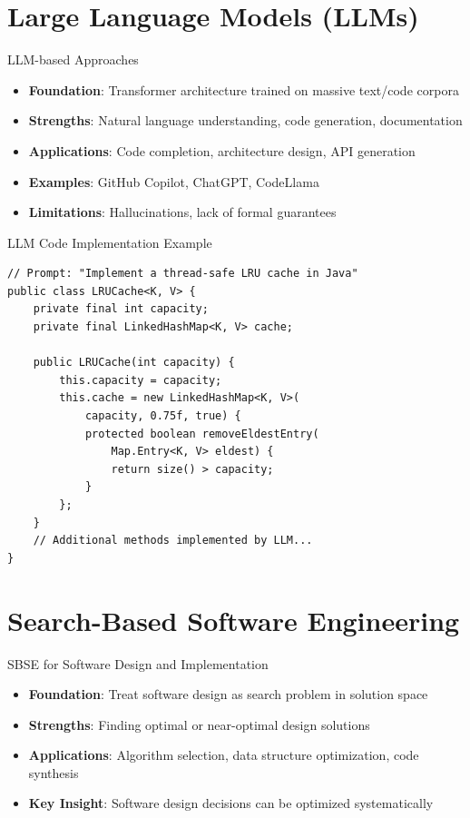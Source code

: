\documentclass{beamer}
\begin{document}
\section{Large Language Models (LLMs)}
\begin{frame}[t]{LLM-based Approaches}
\begin{itemize}
\item \textbf{Foundation}: Transformer architecture trained on massive text/code corpora
\item \textbf{Strengths}: Natural language understanding, code generation, documentation
\item \textbf{Applications}: Code completion, architecture design, API generation
\item \textbf{Examples}: GitHub Copilot, ChatGPT, CodeLlama
\item \textbf{Limitations}: Hallucinations, lack of formal guarantees
\end{itemize}
\end{frame}

\begin{frame}[fragile,t]{LLM Code Implementation Example}
\begin{verbatim}
// Prompt: "Implement a thread-safe LRU cache in Java"
public class LRUCache<K, V> {
    private final int capacity;
    private final LinkedHashMap<K, V> cache;
    
    public LRUCache(int capacity) {
        this.capacity = capacity;
        this.cache = new LinkedHashMap<K, V>(
            capacity, 0.75f, true) {
            protected boolean removeEldestEntry(
                Map.Entry<K, V> eldest) {
                return size() > capacity;
            }
        };
    }
    // Additional methods implemented by LLM...
}
\end{verbatim}
\end{frame}

\section{Search-Based Software Engineering}
\begin{frame}[t]{SBSE for Software Design and Implementation}
\begin{itemize}
\item \textbf{Foundation}: Treat software design as search problem in solution space
\item \textbf{Strengths}: Finding optimal or near-optimal design solutions
\item \textbf{Applications}: Algorithm selection, data structure optimization, code synthesis
\item \textbf{Key Insight}: Software design decisions can be optimized systematically
\end{itemize}
\end{frame}
\end{document}
